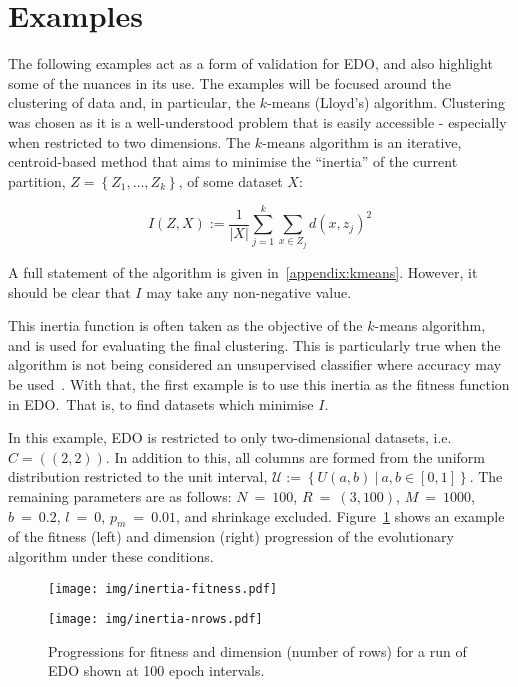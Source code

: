 \section{Examples}\label{section:examples}

The following examples act as a form of validation for EDO, and also highlight
some of the nuances in its use. The examples will be focused around the
clustering of data and, in particular, the \(k\)-means (Lloyd's) algorithm.
Clustering was chosen as it is a well-understood problem that is easily
accessible \-- especially when restricted to two dimensions. The \(k\)-means
algorithm is an iterative, centroid-based method that aims to minimise the
``inertia'' of the current partition, \(Z = \left\{Z_1, \ldots, Z_k\right\}\),
of some dataset \(X\):

\begin{equation}
    I(Z, X) := \frac{1}{|X|} \sum_{j=1}^{k} \sum_{x \in Z_j} {d(x, z_j)}^2
\end{equation}

A full statement of the algorithm is given in~\ref{appendix:kmeans}. However, it
should be clear that \(I\) may take any non-negative value.

This inertia function is often taken as the objective of the \(k\)-means
algorithm, and is used for evaluating the final clustering. This is particularly
true when the algorithm is not being considered an unsupervised classifier where
accuracy may be used~\cite{Huang1998}. With that, the first example is to use
this inertia as the fitness function in EDO.\ That is, to find datasets which
minimise \(I\).

In this example, EDO is restricted to only two-dimensional datasets, i.e.\ \(C =
\left((2, 2)\right)\). In addition to this, all columns are formed from the
uniform distribution restricted to the unit interval, \(\mathcal{U} :=
\left\{U(a, b)~|~a, b \in [0, 1]\right\}\). The remaining parameters are as
follows: \(N~=~100\), \(R~=~(3, 100)\), \(M~=~1000\), \(b~=~0.2\), \(l~=~0\),
\(p_m~=~0.01\), and shrinkage excluded. Figure~\ref{figure:inertia} shows an
example of the fitness (left) and dimension (right) progression of the
evolutionary algorithm under these conditions.

\begin{figure}[htbp]
    \centering
    \begin{minipage}{\imgwidth}
        \centering
        \texttt{[image: img/inertia-fitness.pdf]}
    \end{minipage}

    \begin{minipage}{\imgwidth}
        \centering
        \texttt{[image: img/inertia-nrows.pdf]}
    \end{minipage}
    \caption{Progressions for fitness and dimension (number of rows) for a run
             of EDO shown at 100 epoch intervals.}\label{figure:inertia}
\end{figure}

